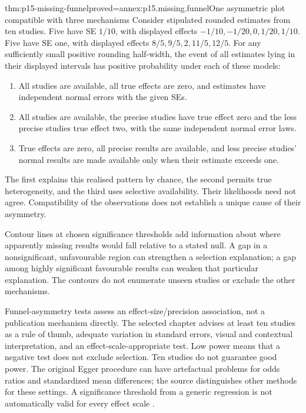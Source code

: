 \begin{hbtheorem}{thm:p15-missing-funnel}{proved=annex:p15.missing.funnel}{One asymmetric plot compatible with three mechanisms}
Consider stipulated rounded estimates from ten studies. Five have
SE \(1/10\), with displayed effects
\(-1/10,-1/20,0,1/20,1/10\). Five have SE one, with displayed
effects \(8/5,9/5,2,11/5,12/5\).
For any sufficiently small positive rounding half-width, the event
of all estimates lying in their displayed intervals has positive
probability under each of these models:
\begin{enumerate}
\item All studies are available, all true effects are zero, and
      estimates have independent normal errors with the given SEs.
\item All studies are available, the precise studies have true effect
      zero and the less precise studies true effect two, with the
      same independent normal error laws.
\item True effects are zero, all precise results are available, and
      less precise studies' normal results are made available only
      when their estimate exceeds one.
\end{enumerate}
The first explains this realised pattern by chance, the second permits
true heterogeneity, and the third uses selective availability.
Their likelihoods need not agree. Compatibility of the observations
does not establish a unique cause of their asymmetry.
\end{hbtheorem}

Contour lines at chosen significance thresholds add information about
where apparently missing results would fall relative to a stated null.
A gap in a nonsignificant, unfavourable region can strengthen a
selection explanation; a gap among highly significant favourable
results can weaken that particular explanation. The contours do not
enumerate unseen studies or exclude the other mechanisms.

Funnel-asymmetry tests assess an effect-size/precision association,
not a publication mechanism directly. The selected chapter advises
at least ten studies as a rule of thumb, adequate variation in
standard errors, visual and contextual interpretation, and an
effect-scale-appropriate test. Low power means that a negative test
does not exclude selection. Ten studies do not guarantee good power.
The original Egger procedure can have artefactual problems for odds
ratios and standardized mean differences; the source distinguishes
other methods for these settings. A significance threshold from a
generic regression is not automatically valid for every effect scale
\cite[sec.~13.3.4.4]{PageHigginsSterne2024Cochrane13}.

